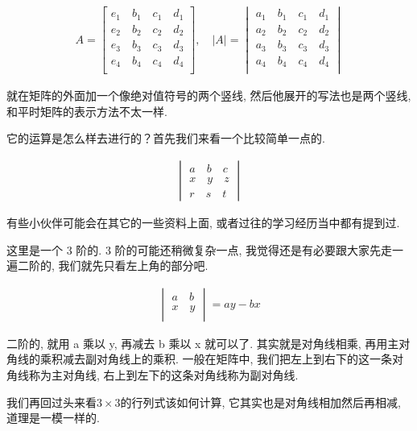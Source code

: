 \begin{align*}
  A = 
  \begin{bmatrix}
  e_1 \quad b_1 \quad c_1 \quad  d_1\\
  e_2 \quad b_2 \quad c_2 \quad  d_2\\ 
  e_3 \quad b_3 \quad c_3 \quad  d_3\\
  e_4 \quad b_4 \quad c_4 \quad  d_4\\
  \end{bmatrix}, \quad
  |A| = 
  \begin{vmatrix}
  a_1 \quad b_1 \quad c_1 \quad d_1\\
  a_2 \quad b_2 \quad c_2 \quad d_2\\
  a_3 \quad b_3 \quad c_3 \quad d_3\\
  a_4 \quad b_4 \quad c_4 \quad d_4\\
  \end{vmatrix}
\end{align*}

就在矩阵的外面加一个像绝对值符号的两个竖线, 然后他展开的写法也是两个竖线, 和平时矩阵的表示方法不太一样. 

它的运算是怎么样去进行的？首先我们来看一个比较简单一点的. 

\begin{align*}
  \begin{vmatrix}
  a \quad b \quad c \\
  x \quad y \quad z \\
  r \quad s \quad t
  \end{vmatrix}
\end{align*}

有些小伙伴可能会在其它的一些资料上面, 或者过往的学习经历当中都有提到过. 

这里是一个 3 阶的. 3 阶的可能还稍微复杂一点, 我觉得还是有必要跟大家先走一遍二阶的, 我们就先只看左上角的部分吧. 

\begin{align*}
  \begin{vmatrix}
  a \quad b  \\
  x \quad y  \\
  \end{vmatrix}
  =
  ay - bx
\end{align*}

二阶的, 就用 a 乘以 y, 再减去 b 乘以 x 就可以了. 其实就是对角线相乘, 再用主对角线的乘积减去副对角线上的乘积. 一般在矩阵中, 我们把左上到右下的这一条对角线称为主对角线, 右上到左下的这条对角线称为副对角线. 

我们再回过头来看$3 \times 3$的行列式该如何计算, 它其实也是对角线相加然后再相减, 道理是一模一样的. 

